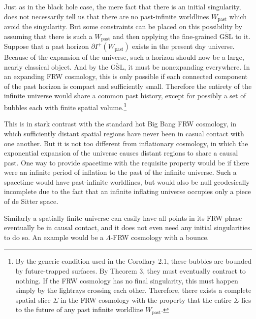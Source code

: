 \documentclass{article}
\begin{document}
Just as in the black hole case, the mere fact that there is an initial singularity, does not necessarily tell us that there are no past-infinite worldlines $W_\mathrm{past}$ which avoid the singularity.  But some constraints can be placed on this possibility by assuming that there is such a $W_\mathrm{past}$ and then applying the fine-grained $\overline{\mathrm{GSL}}$ to it.  Suppose that a past horizon 
$\partial I^+(W_\mathrm{past})$ exists in the present day universe.  Because of the expansion of the universe, such a horizon should now be a large, nearly classical object.  And by the $\overline{\mathrm{GSL}}$, it must be nonexpanding everywhere.  In an expanding FRW cosmology, this is only possible if each connected component of the past horizon is compact and sufficiently small.  Therefore the entirety of the infinite universe would share a common past history, except for possibly a set of bubbles each with finite spatial volume.\footnote{By the generic condition used in the Corollary 2.1, these bubbles are bounded by future-trapped surfaces.  By Theorem 3, they must eventually contract to nothing.  If the FRW cosmology has no final singularity, this must happen simply by the lightrays crossing each other.  Therefore, there exists a complete spatial slice $\Sigma$ in the FRW cosmology with the property that the entire $\Sigma$ lies to the future of any past infinite worldline $W_\mathrm{past}$.}

This is in stark contrast with the standard hot Big Bang FRW cosmology, in which sufficiently distant spatial regions have never been in casual contact with one another.  But it is not too different from inflationary cosmology, in which the exponential expansion of the universe causes distant regions to share a causal past.  One way to provide spacetime with the requisite property would be if there were an infinite period of inflation to the past of the infinite universe.  Such a spacetime would have past-infinite worldlines, but would also be null geodesically incomplete due to the fact that an infinite inflating universe occupies only a piece of de Sitter space.

Similarly a spatially finite universe can easily have all points in its FRW phase eventually be in causal contact, and it does not even need any initial singularities to do so.  An example would be a $\Lambda$-FRW cosmology with a bounce.
\end{document}
